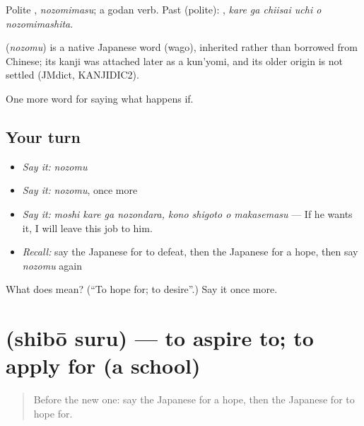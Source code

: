 Polite \textbf{}, \emph{nozomimasu}; a godan verb. Past (polite): \textbf{   }, \emph{kare ga chiisai uchi o nozomimashita}.

\begin{cousinweb}
\textbf{} (\emph{nozomu}) is a native Japanese word (wago), inherited rather than borrowed from Chinese; its kanji was attached later as a kun'yomi, and its older origin is not settled (JMdict, KANJIDIC2).
\end{cousinweb}

\begin{grammarlens}[title={What you've built}]
One more word for saying what happens if.
\end{grammarlens}

\subsection*{Your turn}
\begin{itemize}
\raggedright
  \item \emph{Say it:} \emph{nozomu}
  \item \emph{Say it:} \emph{nozomu}, once more
  \item \emph{Say it:} \emph{moshi kare ga nozondara, kono shigoto o makasemasu} — If he wants it, I will leave this job to him.
  \item \emph{Recall:} say the Japanese for to defeat, then the Japanese for a hope, then say \emph{nozomu} again
\end{itemize}

\begin{tcolorbox}[breakable,colback=teal!4,colframe=teal!35!black,title={Before you move on}]
What does  mean? (\textquotedblleft{}To hope for; to desire\textquotedblright{}.) Say it once more.
\end{tcolorbox}
\section[\texorpdfstring{\ja{しぼうする} (shibō suru)}{しぼうする (shibō suru)}]{ (shibō suru) — to aspire to; to apply for (a school)}

\label{lesson:JA-C507-shibou-suru}



\begin{quote}
Before the new one: say the Japanese for a hope, then the Japanese for to hope for.
\end{quote}

